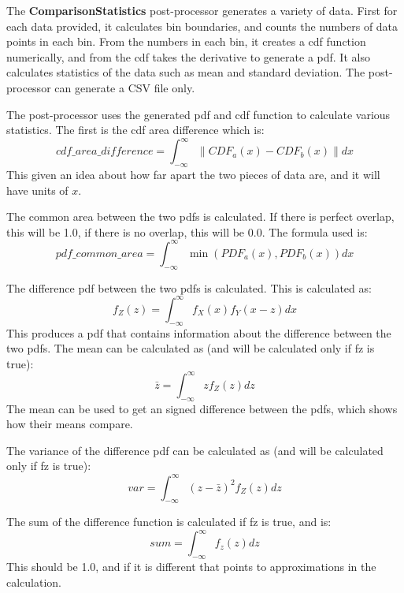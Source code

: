 The \textbf{ComparisonStatistics} post-processor generates a variety
of data.  First for each data provided, it calculates bin boundaries,
and counts the numbers of data points in each bin.  From the numbers
in each bin, it creates a cdf function numerically, and from the cdf
takes the derivative to generate a pdf.  It also calculates statistics
of the data such as mean and standard deviation. The post-processor
can generate a CSV file only.

The post-processor uses the generated pdf and cdf function to
calculate various statistics.  The first is the cdf area difference which is:
\begin{equation}
  cdf\_area\_difference = \int_{-\infty}^{\infty}{\|CDF_a(x)-CDF_b(x)\|dx}
\end{equation}
This given an idea about how far apart the two pieces of data are, and
it will have units of $x$.

The common area between the two pdfs is calculated.  If there is
perfect overlap, this will be 1.0, if there is no overlap, this will
be 0.0.  The formula used is:
\begin{equation}
  pdf\_common\_area = \int_{-\infty}^{\infty}{\min(PDF_a(x),PDF_b(x))}dx
\end{equation}

The difference pdf between the two pdfs is calculated.  This is calculated as:
\begin{equation}
  f_Z(z) = \int_{-\infty}^{\infty}f_X(x)f_Y(x-z)dx
\end{equation}
This produces a pdf that contains information about the difference
between the two pdfs.  The mean can be calculated as (and will be
calculated only if fz is true):
\begin{equation}
  \bar{z} = \int_{-\infty}^{\infty}{z f_Z(z)dz}
\end{equation}
The mean can be used to get an signed difference between the pdfs,
which shows how their means compare.

The variance of the difference pdf can be calculated as (and will be
calculated only if fz is true):
\begin{equation}
  var = \int_{-\infty}^{\infty}{(z-\bar{z})^2 f_Z(z)dz}
\end{equation}

The sum of the difference function is calculated if fz is true, and is:
\begin{equation}
  sum = \int_{-\infty}^{\infty}{f_z(z)dz}
\end{equation}
This should be 1.0, and if it is different that
points to approximations in the calculation.


